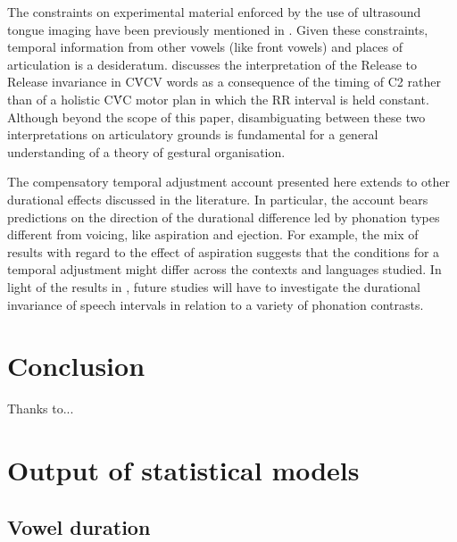\documentclass[preprint]{JASAnew}
\begin{document}
The constraints on experimental material enforced by the use of
ultrasound tongue imaging have been previously mentioned in
. Given these constraints, temporal information from
other vowels (like front vowels) and places of articulation is a
desideratum.  discusses the interpretation of the
Release to Release invariance in CV́CV words as a consequence of the
timing of C2 rather than of a holistic CV́C motor plan in which the RR
interval is held constant. Although beyond the scope of this paper,
disambiguating between these two interpretations on articulatory grounds
is fundamental for a general understanding of a theory of gestural
organisation.

The compensatory temporal adjustment account presented here extends to
other durational effects discussed in the literature. In particular, the
account bears predictions on the direction of the durational difference
led by phonation types different from voicing, like aspiration and
ejection. For example, the mix of results with regard to the effect of
aspiration \citep{durvasula2012} suggests that the conditions for a
temporal adjustment might differ across the contexts and languages
studied. In light of the results in \citet{begus2017}, future studies
will have to investigate the durational invariance of speech intervals
in relation to a variety of phonation contrasts.

\hypertarget{conclusion}{%
\section{Conclusion}\label{conclusion}}

\begin{acknowledgments}
Thanks to...
\end{acknowledgments}

\appendix

\hypertarget{output-of-statistical-models}{%
\section{Output of statistical
models}\label{output-of-statistical-models}}

\label{a:stats}

\hypertarget{vowel-duration-1}{%
\subsection{Vowel duration}\label{vowel-duration-1}}
\end{document}
